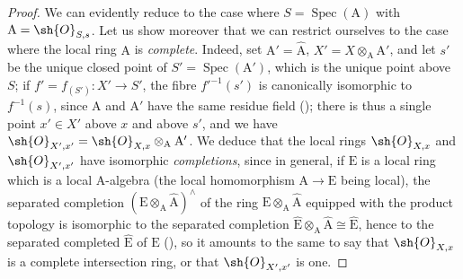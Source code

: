 \begin{proof}
We can evidently reduce to the case where $S=\operatorname{Spec}(\mathrm{A})$ with $\mathrm{A}=\sh{O}_{S,s}$.
Let us show moreover that we can restrict ourselves to the case where the local ring $\mathrm{A}$ is \emph{complete}.
Indeed, set $\mathrm{A}'=\widehat{\mathrm{A}}$, $X'=X\otimes_{\mathrm{A}}\mathrm{A}'$, and let $s'$ be the unique closed point of $S'=\operatorname{Spec}(\mathrm{A}')$, which is the unique point above $S$; if $f'=f_{(S')}:X'\to S'$, the fibre $f'^{-1}(s')$ is canonically isomorphic to $f^{-1}(s)$, since $\mathrm{A}$ and $\mathrm{A}'$ have the same residue field (); there is thus a single point $x'\in X'$ above $x$ and above $s'$, and we have $\sh{O}_{X',x'}=\sh{O}_{X,x}\otimes_{\mathrm{A}}\mathrm{A}'$.
We deduce that the local rings $\sh{O}_{X,x}$ and $\sh{O}_{X',x'}$ have isomorphic \emph{completions}, since in general, if $\mathrm{E}$ is a local ring which is a local $\mathrm{A}$-algebra (the local homomorphism $\mathrm{A}\to\mathrm{E}$ being local), the separated completion $(\mathrm{E}\otimes_{\mathrm{A}}\widehat{\mathrm{A}})^\wedge$ of the ring $\mathrm{E}\otimes_{\mathrm{A}}\widehat{\mathrm{A}}$ equipped with the product topology is isomorphic to the separated completion $\widehat{\mathrm{E}}\otimes_{\mathrm{A}}\widehat{\mathrm{A}}\cong\widehat{\mathrm{E}}$, hence to the separated completed $\widehat{\mathrm{E}}$ of $\mathrm{E}$ (), so it amounts to the same to say that $\sh{O}_{X,x}$ is a complete intersection ring, or that $\sh{O}_{X',x'}$ is one.


\end{proof}
